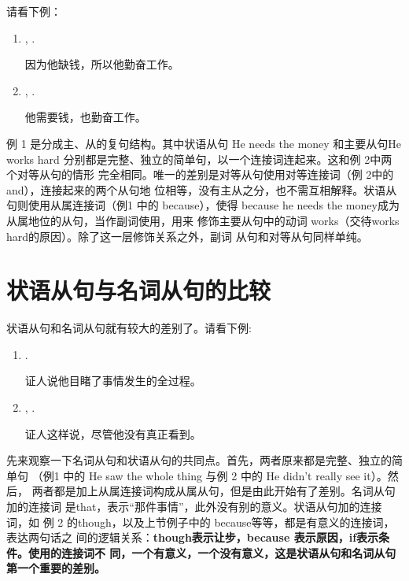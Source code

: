 请看下例：

\begin{enumerate}
\item {} , .

  因为他缺钱，所以他勤奋工作。
\item {},  .

  他需要钱，也勤奋工作。
\end{enumerate}

例 1 是分成主、从的复句结构。其中状语从句 He needs the money 和主要从句He works
hard 分别都是完整、独立的简单句，以一个连接词连起来。这和例 2中两个对等从句的情形
完全相同。唯一的差别是对等从句使用对等连接词（例 2中的and），连接起来的两个从句地
位相等，没有主从之分，也不需互相解释。状语从句则使用从属连接词（例1 中的
because），使得 because he needs the money成为从属地位的从句，当作副词使用，用来
修饰主要从句中的动词 works（交待works hard的原因）。除了这一层修饰关系之外，副词
从句和对等从句同样单纯。

\section{状语从句与名词从句的比较}

状语从句和名词从句就有较大的差别了。请看下例:

\begin{enumerate}
\item {}   .

  证人说他目睹了事情发生的全过程。
\item {}  , 
  .

  证人这样说，尽管他没有真正看到。
\end{enumerate}

先来观察一下名词从句和状语从句的共同点。首先，两者原来都是完整、独立的简单句
（例1 中的 He saw the whole thing 与例 2 中的 He didn't really see it）。然后，
两者都是加上从属连接词构成从属从句，但是由此开始有了差别。名词从句加的连接词
是that，表示“那件事情”，此外没有别的意义。状语从句加的连接词，如
例 2 的though，以及上节例子中的 because等等，都是有意义的连接词，表达两句话之
间的逻辑关系：\textbf{though表示让步，because 表示原因，if表示条件。使用的连接词不
同，一个有意义，一个没有意义，这是状语从句和名词从句第一个重要的差别。}

